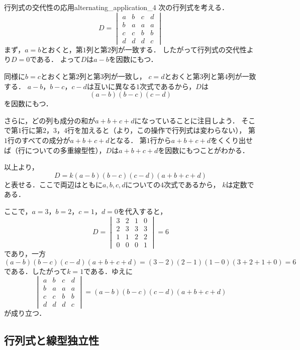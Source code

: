 \begin{example}{行列式の交代性の応用}{alternating_application_4}
  次の行列式を考える．
  \[
  D=
  \begin{vmatrix} 
    a & b & c & d \\
    b & a & a & a \\
    c & c & b & b \\
    d & d & d & c
  \end{vmatrix}
  \]
  まず，$a=b$とおくと，第$1$列と第$2$列が一致する．
  したがって行列式の交代性より$D=0$である．
  よって$D$は$a-b$を因数にもつ．

  同様に$b=c$とおくと第$2$列と第$3$列が一致し，
  $c=d$とおくと第$3$列と第$4$列が一致する．
  $a - b$，$b - c$，$c - d$は互いに異なる$1$次式であるから，$D$は
  \[
    (a-b)(b-c)(c-d)
  \]
  を因数にもつ．

  さらに，どの列も成分の和が$a+b+c+d$になっていることに注目しよう．
  そこで第$1$行に第$2$，$3$，$4$行を加えると（より，この操作で行列式は変わらない），
  第$1$行のすべての成分が$a + b + c + d$となる．
  第$1$行から$a + b + c + d$をくくり出せば（行についての多重線型性），$D$は$a+b+c+d$を因数にもつことがわかる．

  以上より，
  \[
    D
    = k(a-b)(b-c)(c-d)(a+b+c+d)
  \]
  と表せる．ここで両辺はともに$a,b,c,d$についての$4$次式であるから，
  $k$は定数である．

  ここで，$a=3$，$b=2$，$c=1$，$d=0$を代入すると，
  \[
  D=
  \begin{vmatrix} 
    3 & 2 & 1 & 0 \\
    2 & 3 & 3 & 3 \\
    1 & 1 & 2 & 2 \\
    0 & 0 & 0 & 1
  \end{vmatrix}
  =6
  \]
  であり，一方
  \[
    (a-b)(b-c)(c-d)(a+b+c+d)
    =(3-2)(2-1)(1-0)(3+2+1+0)=6
  \]
  である．したがって$k=1$である．ゆえに
  \[
  \begin{vmatrix} 
    a & b & c & d \\
    b & a & a & a \\
    c & c & b & b \\
    d & d & d & c
  \end{vmatrix}
  =
  (a-b)(b-c)(c-d)(a+b+c+d)
  \]
  が成り立つ．
\end{example}

\subsection{行列式と線型独立性}

